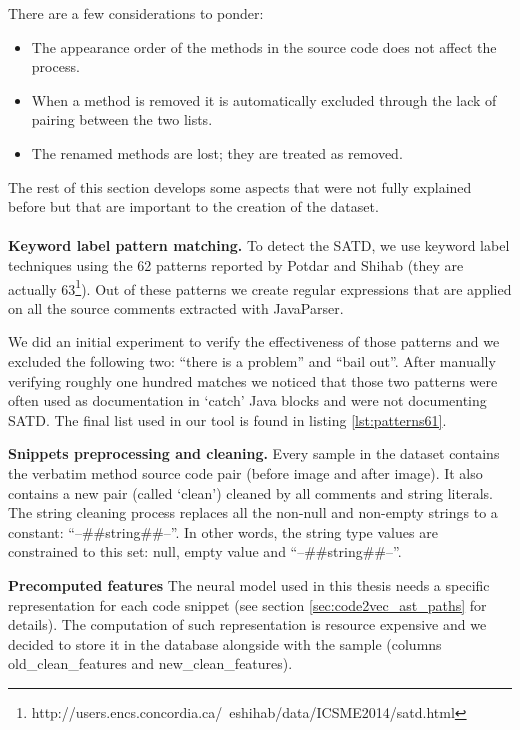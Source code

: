 There are a few considerations to ponder: 

\begin{itemize}
    \item The appearance order of the methods in the source code does not affect the process.
    \item When a method is removed it is automatically excluded through the lack of pairing between the two lists.
    \item The renamed methods are lost; they are treated as removed.
\end{itemize}

\noindent The rest of this section develops some aspects that were not fully explained before but that are important to the creation of the dataset.
\\
\\
\textbf{Keyword label pattern matching.} 
To detect the SATD, we use keyword label techniques using the 62 patterns reported by Potdar and Shihab \cite{potdar2014exploratory} (they are actually 63\footnote{http://users.encs.concordia.ca/~eshihab/data/ICSME2014/satd.html}). Out of these patterns we create regular expressions that are applied on all the source comments extracted with JavaParser.

We did an initial experiment to verify the effectiveness of those patterns and we excluded the following two: ``there is a problem'' and ``bail out''. After manually verifying roughly one hundred matches we noticed that those two patterns were often used as documentation in `catch' Java blocks and were not documenting SATD. The final list used in our tool is found in listing \ref{lst:patterns61}.


\textbf{Snippets preprocessing and cleaning.} \label{sec:cleaning} Every sample in the dataset contains the verbatim method source code pair (before image and after image). It also contains a new pair (called `clean') cleaned by all comments and string literals. The string cleaning process replaces all the non-null and non-empty strings to a constant: ``--\#\#string\#\#--''. In other words, the string type values are constrained to this set: null, empty value and ``--\#\#string\#\#--''.

\textbf{Precomputed features}
The neural model used in this thesis needs a specific representation for each code snippet (see section \ref{sec:code2vec_ast_paths} for details). The computation of such representation is resource expensive and we decided to store it in the database alongside with the sample (columns old\_clean\_features and new\_clean\_features).


